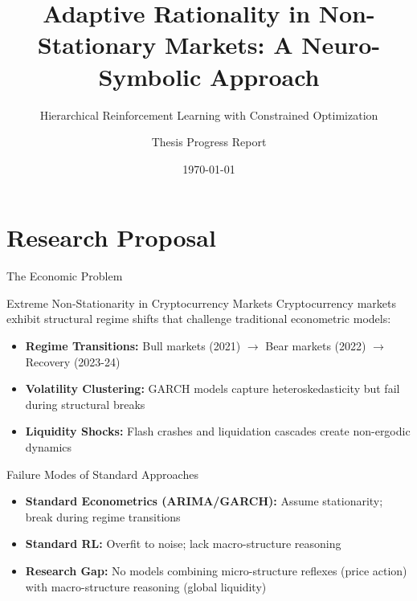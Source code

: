 \documentclass[aspectratio=169]{beamer}
\title{Adaptive Rationality in Non-Stationary Markets: A Neuro-Symbolic Approach}
\subtitle{Hierarchical Reinforcement Learning with Constrained Optimization}
\author{Thesis Progress Report}
\date{\today}
\institute{}
\begin{document}
\begin{frame}[plain]
\titlepage
\end{frame}


\section{Research Proposal}

\begin{frame}{The Economic Problem}
\begin{block}{Extreme Non-Stationarity in Cryptocurrency Markets}
Cryptocurrency markets exhibit \alert{structural regime shifts} that challenge traditional econometric models:
\begin{itemize}
    \item \textbf{Regime Transitions:} Bull markets (2021) $\rightarrow$ Bear markets (2022) $\rightarrow$ Recovery (2023-24)
    \item \textbf{Volatility Clustering:} GARCH models capture heteroskedasticity but fail during \alert{structural breaks}
    \item \textbf{Liquidity Shocks:} Flash crashes and liquidation cascades create non-ergodic dynamics
\end{itemize}
\end{block}

\vspace{0.5cm}

\begin{block}{Failure Modes of Standard Approaches}
\begin{itemize}
    \item \textbf{Standard Econometrics (ARIMA/GARCH):} Assume stationarity; break during regime transitions
    \item \textbf{Standard RL:} Overfit to noise; lack \alert{macro-structure reasoning}
    \item \textbf{Research Gap:} No models combining \alert{micro-structure reflexes} (price action) with \alert{macro-structure reasoning} (global liquidity)
\end{itemize}
\end{block}
\end{frame}
\end{document}
